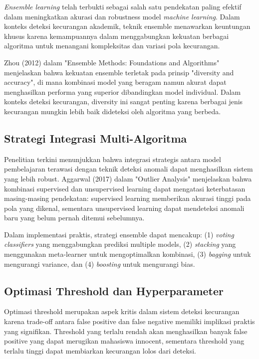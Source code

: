 \textit{Ensemble learning} telah terbukti sebagai salah satu pendekatan paling efektif dalam meningkatkan akurasi dan robustness model \textit{machine learning}. Dalam konteks deteksi kecurangan akademik, teknik ensemble menawarkan keuntungan khusus karena kemampuannya dalam menggabungkan kekuatan berbagai algoritma untuk menangani kompleksitas dan variasi pola kecurangan.

Zhou (2012) dalam "Ensemble Methods: Foundations and Algorithms" menjelaskan bahwa kekuatan ensemble terletak pada prinsip "diversity and accuracy", di mana kombinasi model yang beragam namun akurat dapat menghasilkan performa yang superior dibandingkan model individual. Dalam konteks deteksi kecurangan, diversity ini sangat penting karena berbagai jenis kecurangan mungkin lebih baik dideteksi oleh algoritma yang berbeda.

\subsection{Strategi Integrasi Multi-Algoritma}

Penelitian terkini menunjukkan bahwa integrasi strategis antara model pembelajaran terawasi dengan teknik deteksi anomali dapat menghasilkan sistem yang lebih robust. Aggarwal (2017) dalam "Outlier Analysis" menjelaskan bahwa kombinasi supervised dan unsupervised learning dapat mengatasi keterbatasan masing-masing pendekatan: supervised learning memberikan akurasi tinggi pada pola yang dikenal, sementara unsupervised learning dapat mendeteksi anomali baru yang belum pernah ditemui sebelumnya.

Dalam implementasi praktis, strategi ensemble dapat mencakup: (1) \textit{voting classifiers} yang menggabungkan prediksi multiple models, (2) \textit{stacking} yang menggunakan meta-learner untuk mengoptimalkan kombinasi, (3) \textit{bagging} untuk mengurangi variance, dan (4) \textit{boosting} untuk mengurangi bias.

\subsection{Optimasi Threshold dan Hyperparameter}

Optimasi threshold merupakan aspek kritis dalam sistem deteksi kecurangan karena trade-off antara false positive dan false negative memiliki implikasi praktis yang signifikan. Threshold yang terlalu rendah akan menghasilkan banyak false positive yang dapat merugikan mahasiswa innocent, sementara threshold yang terlalu tinggi dapat membiarkan kecurangan lolos dari deteksi.

